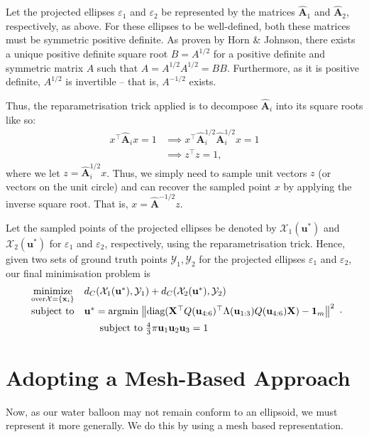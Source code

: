 \documentclass{article}
\begin{document}
Let the projected ellipses $\varepsilon_1$ and $\varepsilon_2$ be represented by the matrices $\hat{\mathbf A}_1$ and $\hat{\mathbf A}_2$, respectively, as above. For these ellipses to be well-defined, both these matrices must be symmetric positive definite. As proven by Horn \& Johnson, there exists a unique positive definite square root $B=A^{1/2}$ for a positive definite and symmetric matrix $A$ such that $A= A^{1/2} A^{1/2}  = BB$. Furthermore, as it is positive definite, $A^{1/2}$ is invertible -- that is, $A^{-1/2}$ exists.

Thus, the reparametrisation trick applied is to decompose $\hat{\mathbf A}_i$ into its square roots like so:
\begin{align}
    x^\top \hat{\mathbf A}_i x = 1 &\implies x^\top \hat{\mathbf A}^{1/2}_i \hat{\mathbf A}^{1/2}_i x = 1 \\
    &\implies z^\top z = 1,
\end{align}
where we let $z = \hat{\mathbf A}^{1/2}_i x$. Thus, we simply need to sample unit vectors $z$ (or vectors on the unit circle) and can recover the sampled point $x$ by applying the inverse square root. That is, $x = \hat{\mathbf A}^{-1/2}z$.


Let the sampled points of the projected ellipses be denoted by $\mathcal X_1(\mathbf u^*)$ and $\mathcal X_2(\mathbf u^*)$ for $\varepsilon_1$ and $\varepsilon_2$, respectively, using the reparametrisation trick. Hence, given two sets of ground truth points $\mathcal Y_1, \mathcal Y_2$ for the projected ellipses $\varepsilon_1$ and $\varepsilon_2$, our final minimisation problem is
$$
\begin{array}{ll}
    \underset{\text{over} \mathcal X = \{ \mathbf x_i \}}{\text{minimize}} &  d_C(\mathcal X_1(\mathbf u^*), \mathcal Y_1) + d_C(\mathcal X_2(\mathbf u^*), \mathcal Y_2) \\[0.5em]
  \text{subject to} & \mathbf u^* = \text{argmin} \; \!\left\Vert \text{diag}(\mathbf X^\top Q(\mathbf u_{4:6}) ^\top \Lambda(\mathbf u_{1:3}) Q(\mathbf u_{4:6}) \mathbf X) - \mathbf 1_m \right\Vert ^2 \\[0.5em]
  & \hphantom{y =} \text{subject to} \;  \frac{4}{3} \pi \mathbf u_1 \mathbf u_2 \mathbf u_3 = 1
\end{array}.
$$

\section{Adopting a Mesh-Based Approach}
Now, as our water balloon may not remain conform to an ellipsoid, we must represent it more generally. We do this by using a mesh based representation.
\end{document}

